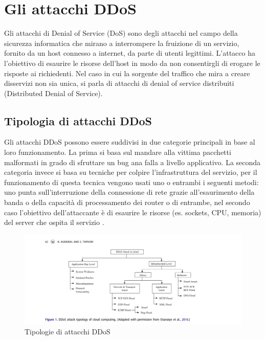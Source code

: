

\section{Gli attacchi DDoS}

Gli attacchi di Denial of Service (DoS) sono degli attacchi nel campo della sicurezza informatica che mirano a interrompere la fruizione di un servizio, fornito da un host connesso a internet, da parte di utenti legittimi. L'attacco ha l'obiettivo di esaurire le risorse dell'host in modo da non consentirgli di erogare le risposte ai richiedenti.
Nel caso in cui la sorgente del traffico che mira a creare disservizi non sia unica, si parla di attacchi di denial of service distribuiti (Distributed Denial of Service).

\subsection{Tipologia di attacchi DDoS}
    
Gli attacchi DDoS possono essere suddivisi in due categorie principali in base al loro funzionamento. La prima si basa sul mandare alla vittima pacchetti malformati in grado di sfruttare un bug ana falla a livello applicativo. La seconda categoria invece si basa su tecniche per colpire l'infrastruttura del servizio, per il funzionamento di questa tecnica vengono usati uno o entrambi i seguenti metodi: uno punta sull'interruzione della connessione di rete grazie all'esaurimento della banda o della capacità di processamento dei router o di entrambe, nel secondo caso l'obiettivo dell'attaccante è di esaurire le risorse (es. sockets, CPU, memoria) del server che ospita il servizio \cite{ddos_survey_1}.

\begin{figure}[h]
    \includegraphics[width=\hsize]{images/introduzione/tipologie_ddos.png}
    \caption{Tipologie di attacchi DDoS \cite{ddos_survey_3}}
    \centering
\end{figure}

